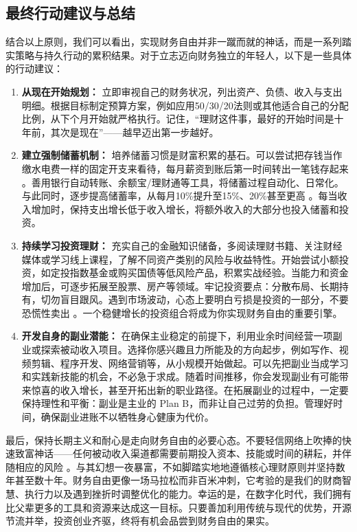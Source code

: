 \documentclass[
  12pt]{article}
\providecommand{\tightlist}{%
  \setlength{\itemsep}{0pt}\setlength{\parskip}{0pt}}
\begin{document}
\hypertarget{ux6700ux7ec8ux884cux52a8ux5efaux8baeux4e0eux603bux7ed3}{%
\subsection{最终行动建议与总结}\label{ux6700ux7ec8ux884cux52a8ux5efaux8baeux4e0eux603bux7ed3}}

结合以上原则，我们可以看出，实现财务自由并非一蹴而就的神话，而是一系列踏实策略与持久行动的累积结果。对于立志迈向财务独立的年轻人，以下是一些具体的行动建议：

\begin{enumerate}
\def\labelenumi{\arabic{enumi}.}
\tightlist
\item
  \textbf{从现在开始规划：}
  立即审视自己的财务状况，列出资产、负债、收入与支出明细。根据目标制定预算方案，例如应用50/30/20法则或其他适合自己的分配比例，从下个月开始就严格执行。记住，``理财这件事，最好的开始时间是十年前，其次是现在''------越早迈出第一步越好。
\item
  \textbf{建立强制储蓄机制：}
  培养储蓄习惯是财富积累的基石。可以尝试把存钱当作缴水电费一样的固定开支来看待，每月薪资到账后第一时间转出一笔钱存起来
  \cite{ref3}。善用银行自动转账、余额宝/理财通等工具，将储蓄过程自动化、日常化。与此同时，逐步提高储蓄率，从每月10\%提升至15\%、20\%甚至更高
  \cite{ref3}。每当收入增加时，保持支出增长低于收入增长，将额外收入的大部分也投入储蓄和投资。
\item
  \textbf{持续学习投资理财：}
  充实自己的金融知识储备，多阅读理财书籍、关注财经媒体或学习线上课程，了解不同资产类别的风险与收益特性。开始尝试小额投资，如定投指数基金或购买国债等低风险产品，积累实战经验。当能力和资金增加后，可逐步拓展至股票、房产等领域。牢记投资要点：分散布局、长期持有，切勿盲目跟风。遇到市场波动，心态上要明白亏损是投资的一部分，不要恐慌性卖出
  \cite{ref3}。一个稳健增长的投资组合将成为你实现财务自由的重要引擎。
\item
  \textbf{开发自身的副业潜能：}
  在确保主业稳定的前提下，利用业余时间经营一项副业或探索被动收入项目。选择你感兴趣且力所能及的方向起步，例如写作、视频剪辑、程序开发、网络营销等，从小规模开始做起。可以先把副业当成学习和实践新技能的机会，不必急于求成。随着时间推移，你会发现副业有可能带来惊喜的收入增长，甚至开拓出新的职业路径。在拓展副业的过程中，一定要保持理性和平衡：副业是主业的
  Plan
  B，而非让自己过劳的负担。管理好时间，确保副业进账不以牺牲身心健康为代价。
\end{enumerate}

最后，保持长期主义和耐心是走向财务自由的必要心态。不要轻信网络上吹捧的快速致富神话------任何被动收入渠道都需要前期投入资本、技能或时间的耕耘，并伴随相应的风险
\cite{ref5}。与其幻想一夜暴富，不如脚踏实地地遵循核心理财原则并坚持数年甚至数十年。财务自由更像一场马拉松而非百米冲刺，它考验的是我们的财商智慧、执行力以及遇到挫折时调整优化的能力。幸运的是，在数字化时代，我们拥有比父辈更多的工具和资源来达成这一目标。只要善加利用传统与现代的优势，开源节流并举，投资创业齐驱，终将有机会品尝到财务自由的果实。
\end{document}
